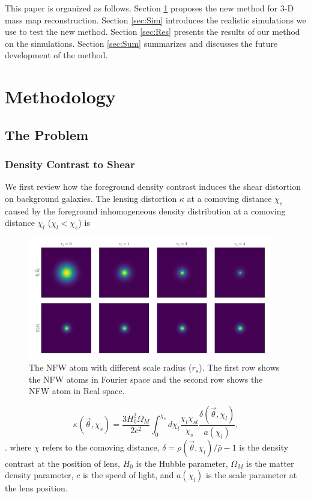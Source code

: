 \documentclass[twocolumn]{aastex62}
\begin{document}
This paper is organized as follows. 
Section \ref{sec:MethodAll} proposes the new method for $3$-D mass map reconstruction. 
Section \ref{sec:Sim} introduces the realistic simulations we use to test the new method.
Section \ref{sec:Res} presents the results of our method on the simulations.
Section \ref{sec:Sum} summarizes and discusses the future development of the method.

\section{Methodology}
\label{sec:MethodAll}

\subsection{The Problem}
\subsubsection{Density Contrast to Shear}
We first review how the foreground density contrast induces the shear distortion on background galaxies.
The lensing distortion $\kappa$ at a comoving distance $\chi_s$ caused by the foreground inhomogeneous 
density distribution at a comoving distance $\chi_l$ ($\chi_l< \chi_s$) is

\begin{figure}
    \includegraphics[width=0.95\textwidth]{nfwlet-atom-2D.pdf}
    \caption{The NFW atom with different scale radius ($r_s$). The first row shows the NFW atoms in Fourier 
            space and the second row shows the NFW atom in Real space.}
\end{figure}


\begin{equation}
\kappa(\vec{\theta},\chi_s)=\frac{3H_0^2\Omega_M}{2 c^2} \int_0^{\chi_s} d\chi_l \frac{\chi_l \chi_{sl}}{\chi_s}
\frac{\delta(\vec{\theta},\chi_l)}{a(\chi_l)},
\end{equation}
\citep{massMap-Glimpse3D2014}.
where $\chi$ refers to the comoving distance, $\delta=\rho(\vec{\theta},\chi_l)/\bar{\rho}-1$ is the density contrast
at the position of lens, $H_0$ is the Hubble parameter, $\Omega_M$ is the matter density parameter, $c$ is the speed 
of light, and $a(\chi_l)$ is the scale parameter at the lens position. 
\end{document}
